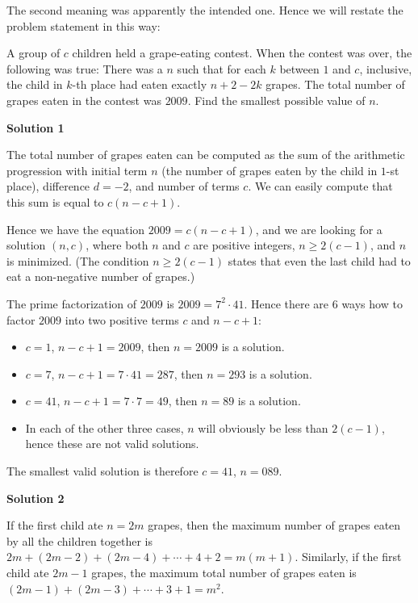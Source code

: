 \begin{enumerate}
 The second meaning was apparently the intended one. Hence we will restate the problem statement in this way:

 A group of $c$ children held a grape-eating contest. When the contest was over, the following was true: There was a $n$ such that for each $k$ between $1$ and $c$, inclusive, the child in $k$-th place had eaten exactly $n+2-2k$ grapes. The total number of grapes eaten in the contest was $2009$. Find the smallest possible value of $n$.

 



\textbf{Solution 1}

The total number of grapes eaten can be computed as the sum of the arithmetic progression with initial term $n$ (the number of grapes eaten by the child in $1$-st place), difference $d=-2$, and number of terms $c$. We can easily compute that this sum is equal to $c(n-c+1)$.

 Hence we have the equation $2009=c(n-c+1)$, and we are looking for a solution $(n,c)$, where both $n$ and $c$ are positive integers, $n\geq 2(c-1)$, and $n$ is minimized. (The condition $n\geq 2(c-1)$ states that even the last child had to eat a non-negative number of grapes.)

 The prime factorization of $2009$ is $2009=7^2 \cdot 41$. Hence there are $6$ ways how to factor $2009$ into two positive terms $c$ and $n-c+1$:

 
            \begin{itemize}
        \item $c=1$, $n-c+1=2009$, then $n=2009$ is a solution.
        \item $c=7$, $n-c+1=7\cdot 41=287$, then $n=293$ is a solution.
        \item $c=41$, $n-c+1=7\cdot 7=49$, then $n=89$ is a solution.
        \item In each of the other three cases, $n$ will obviously be less than $2(c-1)$, hence these are not valid solutions.
            \end{itemize}
            The smallest valid solution is therefore $c=41$, $n=\boxed{089}$.

 



\textbf{Solution 2}

If the first child ate $n=2m$ grapes, then the maximum number of grapes eaten by all the children together is $2m + (2m-2) + (2m-4) + \cdots + 4 + 2 = m(m+1)$. Similarly, if the first child ate $2m-1$ grapes, the maximum total number of grapes eaten is $(2m-1)+(2m-3)+\cdots+3+1 = m^2$.


\end{enumerate}

